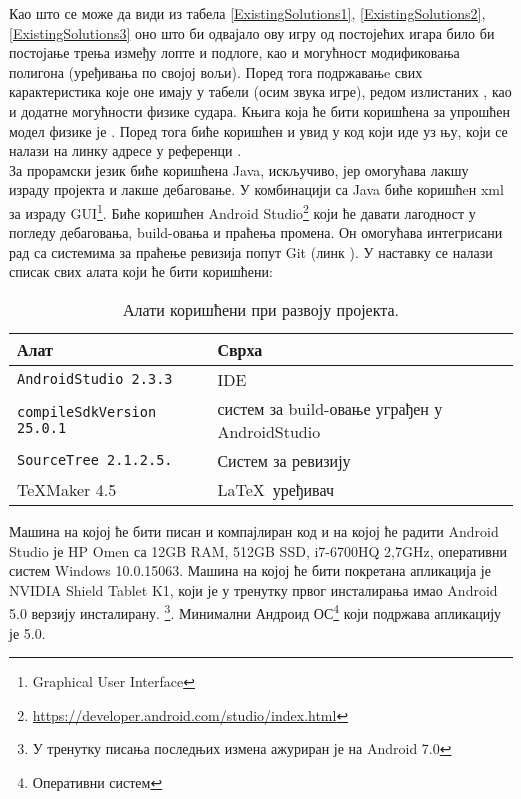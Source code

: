 Као што се може да види из табела \ref{ExistingSolutions1}, \ref{ExistingSolutions2}, \ref{ExistingSolutions3} оно што би одвајало ову игру од постојећих игара било би постојање трења између лопте и подлоге, као и могућност модификовања полигона (уређивања по својој вољи). Поред тога подржавањe свих карактеристика које оне имају у табели (осим звука игре), редом излистаних , као и додатне могућности физике судара.  Књига која ће бити коришћена за упрошћен модел физике је \cite{EngBook}. Поред тога биће коришћен и увид у код који иде уз њу, који се налази на линку адресе у референци \cite{ModCol}.
\\ \indent
За прорамски језик биће коришћена Java, искључиво, јер омогућава лакшу израду пројекта и лакше дебаговање. У комбинацији са Java биће коришћeн xml за израду GUI\footnote{Graphical User Interface}. Биће коришћен  Android Studio\footnote{\url{https://developer.android.com/studio/index.html}} који ће давати лагодност у погледу дебаговања, build-овања и праћења промена. Он омогућава интегрисани рад са системима за праћење ревизија попут Git (линк \cite{BitBucket}). У наставку се налази списак свих алата који ће бити коришћени:
\begin{table}[H]\centering
\begin{tabular}{ l  l } \toprule
{\bf Алат} & {\bf Сврха}\\ \midrule
{\tt AndroidStudio 2.3.3} & IDE\\
{\tt compileSdkVersion 25.0.1} & систем за build-овање уграђен у AndroidStudio\\
{\tt SourceTree 2.1.2.5.} & Систем за ревизију\\
\TeX Maker 4.5 & \LaTeX\ уређивач\\
\bottomrule
\end{tabular}
\caption{Алати коришћени при развоју пројекта.} \label{UsedTools}
\end{table}
Машина на којој ће бити писан и компајлиран код и на којој ће радити Android Studio је HP Omen са 12GB RAM, 512GB SSD, i7-6700HQ 2,7GHz, оперативни систем Windows 10.0.15063. Машина на којој ће бити покретана апликација је NVIDIA Shield Tablet K1, који је у тренутку првог инсталирања имао Android 5.0 верзију инсталирану. \footnote{У тренутку писања последњих измена ажуриран је на Android 7.0}. Минимални Андроид ОС\footnote{Оперативни систем} који подржава апликацију је 5.0.
